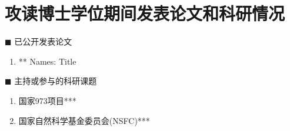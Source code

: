 \section*{攻读博士学位期间发表论文和科研情况}

\vskip 5mm

{\heiti $\blacksquare$ 已公开发表论文}\vskip 5mm

\begin{enumerate}

  \item 	 \ifpeerview *** \else Names\fi: Title
  
  

\end{enumerate}


\bigskip\bigskip\bigskip


{\heiti $\blacksquare$ 主持或参与的科研课题}\vskip 5mm

\begin{enumerate}

  \item 国家973项目***

  \item 国家自然科学基金委员会(NSFC)***
  
\end{enumerate}




